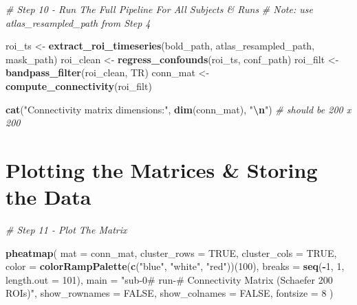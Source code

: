 \documentclass[
]{article}
\newenvironment{Shaded}{\begin{snugshade}}{\end{snugshade}}
\newcommand{\AttributeTok}[1]{\textcolor[rgb]{0.13,0.29,0.53}{#1}}
\newcommand{\CommentTok}[1]{\textcolor[rgb]{0.56,0.35,0.01}{\textit{#1}}}
\newcommand{\ConstantTok}[1]{\textcolor[rgb]{0.56,0.35,0.01}{#1}}
\newcommand{\DecValTok}[1]{\textcolor[rgb]{0.00,0.00,0.81}{#1}}
\newcommand{\FunctionTok}[1]{\textcolor[rgb]{0.13,0.29,0.53}{\textbf{#1}}}
\newcommand{\NormalTok}[1]{#1}
\newcommand{\OtherTok}[1]{\textcolor[rgb]{0.56,0.35,0.01}{#1}}
\newcommand{\SpecialCharTok}[1]{\textcolor[rgb]{0.81,0.36,0.00}{\textbf{#1}}}
\newcommand{\StringTok}[1]{\textcolor[rgb]{0.31,0.60,0.02}{#1}}
\begin{document}
\begin{Shaded}
\begin{Highlighting}[]
\CommentTok{\# Step 10 {-} Run The Full Pipeline For All Subjects \& Runs }
\CommentTok{\# Note: use atlas\_resampled\_path from Step 4}

\NormalTok{roi\_ts    }\OtherTok{\textless{}{-}} \FunctionTok{extract\_roi\_timeseries}\NormalTok{(bold\_path, atlas\_resampled\_path, mask\_path)}
\NormalTok{roi\_clean }\OtherTok{\textless{}{-}} \FunctionTok{regress\_confounds}\NormalTok{(roi\_ts, conf\_path)}
\NormalTok{roi\_filt  }\OtherTok{\textless{}{-}} \FunctionTok{bandpass\_filter}\NormalTok{(roi\_clean, TR)}
\NormalTok{conn\_mat  }\OtherTok{\textless{}{-}} \FunctionTok{compute\_connectivity}\NormalTok{(roi\_filt)}

\FunctionTok{cat}\NormalTok{(}\StringTok{"Connectivity matrix dimensions:"}\NormalTok{, }\FunctionTok{dim}\NormalTok{(conn\_mat), }\StringTok{"}\SpecialCharTok{\textbackslash{}n}\StringTok{"}\NormalTok{) }\CommentTok{\# should be 200 x 200}
\end{Highlighting}
\end{Shaded}

\section{Plotting the Matrices \& Storing the
Data}\label{plotting-the-matrices-storing-the-data}

\begin{Shaded}
\begin{Highlighting}[]
\CommentTok{\# Step 11 {-} Plot The Matrix }

\FunctionTok{pheatmap}\NormalTok{(}
  \AttributeTok{mat          =}\NormalTok{ conn\_mat,}
  \AttributeTok{cluster\_rows =} \ConstantTok{TRUE}\NormalTok{,}
  \AttributeTok{cluster\_cols =} \ConstantTok{TRUE}\NormalTok{,}
  \AttributeTok{color        =} \FunctionTok{colorRampPalette}\NormalTok{(}\FunctionTok{c}\NormalTok{(}\StringTok{"blue"}\NormalTok{, }\StringTok{"white"}\NormalTok{, }\StringTok{"red"}\NormalTok{))(}\DecValTok{100}\NormalTok{),}
  \AttributeTok{breaks       =} \FunctionTok{seq}\NormalTok{(}\SpecialCharTok{{-}}\DecValTok{1}\NormalTok{, }\DecValTok{1}\NormalTok{, }\AttributeTok{length.out =} \DecValTok{101}\NormalTok{),}
  \AttributeTok{main         =} \StringTok{"sub{-}0\# run{-}\# Connectivity Matrix (Schaefer 200 ROIs)"}\NormalTok{,}
  \AttributeTok{show\_rownames =} \ConstantTok{FALSE}\NormalTok{,}
  \AttributeTok{show\_colnames =} \ConstantTok{FALSE}\NormalTok{,}
  \AttributeTok{fontsize     =} \DecValTok{8}
\NormalTok{)}
\end{Highlighting}
\end{Shaded}
\end{document}
